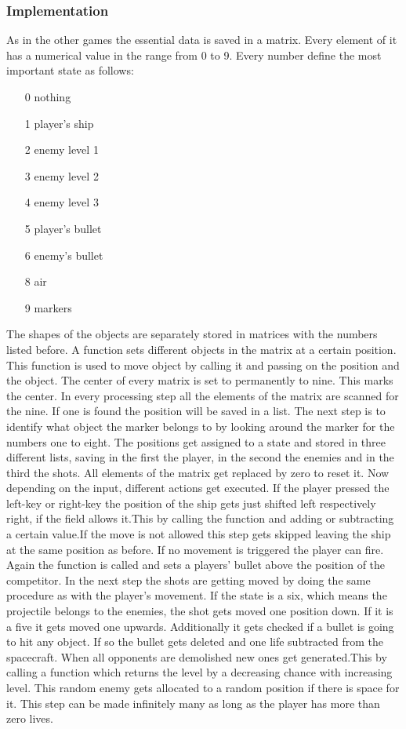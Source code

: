 \documentclass[12pt]{article}
\begin{document}
\subsubsection{Implementation}
As in the other games the essential data is saved in a matrix. Every element of it has a numerical value in the range from 0 to 9. Every number define the most important \gls{state} as follows:
\begin{itemize}
\item[0] nothing
\item[1] player's ship
\item[2] enemy level 1
\item[3] enemy level 2
\item[4] enemy level 3
\item[5] player's bullet
\item[6] enemy's bullet
\item[8] air
\item[9] markers
\end{itemize}
The shapes of the objects are separately stored in matrices with the numbers listed before. A function sets different objects in the matrix at a certain position. This function is used to move object by calling it and passing on the position and the object. The center of every matrix is set to permanently to nine. This marks the center. In every processing step all the elements of the matrix are scanned for the nine. If one is found the position will be saved in a list. The next step is to identify what object the marker belongs to by looking around the marker for the numbers one to eight. The positions get assigned to a \gls{state} and stored in three different lists, saving in the first the player, in the second the enemies and in the third the shots. All elements of the matrix get replaced by zero to reset it. Now depending on the  \gls{input}, different actions get executed.
If the player pressed the left-key or right-key the position of the ship gets just shifted left respectively right, if the field allows it.This by calling the function and adding or subtracting a certain value.If the move is not allowed this step gets skipped leaving the ship at the same position as before. If no movement is triggered the player can fire. Again the function is called and sets a players' bullet above the position of the competitor.
In the next step the shots are getting moved by doing the same procedure as with the player's movement. If the \gls{state} is a six, which means the projectile belongs to the enemies, the shot gets moved one position down. If it is a five it gets moved one upwards. Additionally it gets checked if a bullet is going to hit any object. If so the bullet gets deleted and one life subtracted from the spacecraft. When all opponents are demolished new ones get generated.This by calling a function which returns the level by a decreasing chance with increasing level. This random enemy gets allocated to a random position if there is space for it. This step can be made infinitely many as long as the player has more than zero lives.   
\end{document}
